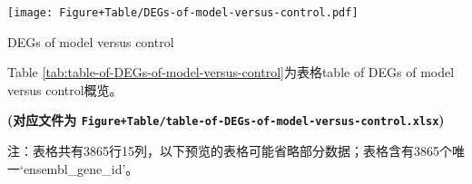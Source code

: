 \documentclass[
]{article}
\begin{document}
\def\@captype{figure}
\begin{center}
\texttt{[image: Figure+Table/DEGs-of-model-versus-control.pdf]}
\caption{DEGs of model versus control}\label{fig:DEGs-of-model-versus-control}
\end{center}

Table \ref{tab:table-of-DEGs-of-model-versus-control}为表格table of DEGs of model versus control概览。

\textbf{(对应文件为 \texttt{Figure+Table/table-of-DEGs-of-model-versus-control.xlsx})}

\begin{center}\begin{tcolorbox}[colback=gray!10, colframe=gray!50, width=0.9\linewidth, arc=1mm, boxrule=0.5pt]注：表格共有3865行15列，以下预览的表格可能省略部分数据；表格含有3865个唯一`ensembl\_gene\_id'。
\end{tcolorbox}
\end{center}
\end{document}
